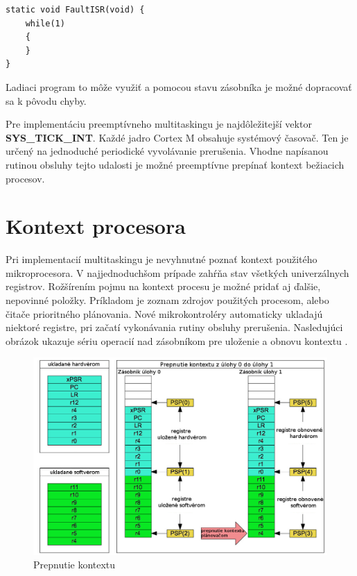 {\small
\begin{verbatim}
static void FaultISR(void) {
    while(1)
    {
    }
}
\end{verbatim}
}

Ladiaci program to môže využiť a pomocou stavu zásobníka je možné dopracovať sa k pôvodu chyby.

Pre implementáciu preemptívneho multitaskingu je najdôležitejší vektor \textbf{SYS\_TICK\_INT}. Každé jadro Cortex M obsahuje systémový časovač. Ten je určený na jednoduché periodické vyvolávanie prerušenia. Vhodne napísanou rutinou obsluhy tejto udalosti je možné preemptívne prepínať kontext bežiacich procesov.

\section{Kontext procesora}

Pri implementacií multitaskingu je nevyhnutné poznať kontext použitého mikroprocesora. V najjednoduchšom prípade zahŕňa stav všetkých univerzálnych registrov. Rožšírením pojmu na kontext procesu je možné pridať aj ďalšie, nepovinné položky. Príkladom je zoznam zdrojov použitých procesom, alebo čitače prioritného plánovania. Nové mikrokontroléry automaticky ukladajú niektoré registre, pri začatí vykonávania rutiny obsluhy prerušenia. Nasledujúci obrázok ukazuje sériu operacií nad zásobníkom pre uloženie a obnovu kontextu \cite{context_switch}.

\begin{figure}[ht]
\begin{center}
\begin{minipage}{1.1\linewidth}
\begin{center}
\includegraphics[width=.85\textwidth]{images/context_switch.png}
\caption{Prepnutie kontextu}
\label{obr2}
\end{center}
\end{minipage}
\end{center}
\end{figure}

